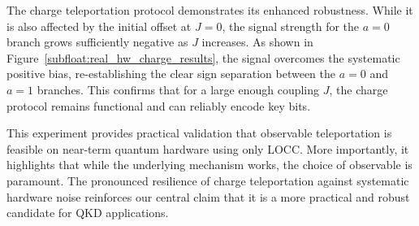 The charge teleportation protocol demonstrates its enhanced robustness. While it is also affected by the initial offset at \( J=0 \), the signal strength for the \( a=0 \) branch grows sufficiently negative as \( J \) increases. As shown in Figure~\ref{subfloat:real_hw_charge_results}, the signal overcomes the systematic positive bias, re-establishing the clear sign separation between the \( a=0 \) and \( a=1 \) branches. This confirms that for a large enough coupling \( J \), the charge protocol remains functional and can reliably encode key bits.

This experiment provides practical validation that observable teleportation is feasible on near-term quantum hardware using only LOCC. More importantly, it highlights that while the underlying mechanism works, the choice of observable is paramount. The pronounced resilience of charge teleportation against systematic hardware noise reinforces our central claim that it is a more practical and robust candidate for QKD applications.
